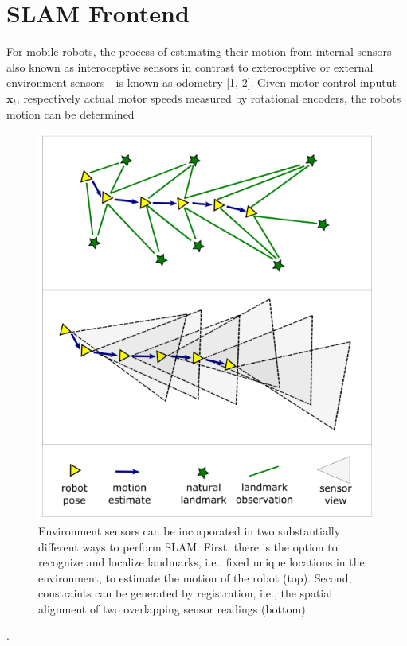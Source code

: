 \documentclass[english]{article}
\begin{document}
\section{\label{sec:SLAM_fronted}SLAM Frontend}
For mobile robots, the process of estimating their motion from internal
sensors - also known as interoceptive sensors in contrast to exteroceptive
or external environment sensors - is known as odometry [1, 2].  Given motor
control inputut $\mathbf{x}_{t}$, respectively actual motor speeds measured
by rotational encoders, the robots motion can be determined


\begin{figure}[H]
    \centering
    \includegraphics{Images/Schema_1.png}
    \caption{Environment sensors can be incorporated in two substantially
    different ways to perform SLAM. First, there is  the  option  to
    recognize  and  localize  landmarks,  i.e.,  fixed  unique  locations
    in  the  environment,  to  estimate  the motion of the robot (top).
    Second,  constraints can be generated by registration,  i.e.,  the
    spatial alignment of two overlapping sensor readings (bottom).}
    \label{fig:Schema_1}
\end{figure}
.
\end{document}
